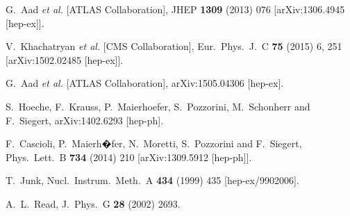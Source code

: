 \documentclass[preprintnumbers,superscriptaddress,nofootinbib,aps,prd,floatfix]{revtex4}
\begin{document}
\begin{thebibliography}{99}
  G.~Aad {\it et al.}  [ATLAS Collaboration],
  JHEP {\bf 1309} (2013) 076
  [arXiv:1306.4945 [hep-ex]].
  
  V.~Khachatryan {\it et al.} [CMS Collaboration],
  Eur.\ Phys.\ J.\ C {\bf 75} (2015) 6,  251
  [arXiv:1502.02485 [hep-ex]].
  
  G.~Aad {\it et al.} [ATLAS Collaboration],
  arXiv:1505.04306 [hep-ex].
  
  S.~Hoeche, F.~Krauss, P.~Maierhoefer, S.~Pozzorini, M.~Schonherr and F.~Siegert,
  arXiv:1402.6293 [hep-ph].
  
  F.~Cascioli, P.~Maierh�fer, N.~Moretti, S.~Pozzorini and F.~Siegert,
  Phys.\ Lett.\ B {\bf 734} (2014) 210
  [arXiv:1309.5912 [hep-ph]].
 
  T.~Junk,
  Nucl.\ Instrum.\ Meth.\ A {\bf 434} (1999) 435
  [hep-ex/9902006].
  
  A.~L.~Read,
  J.\ Phys.\ G {\bf 28} (2002) 2693.


\end{thebibliography}
\end{document}

